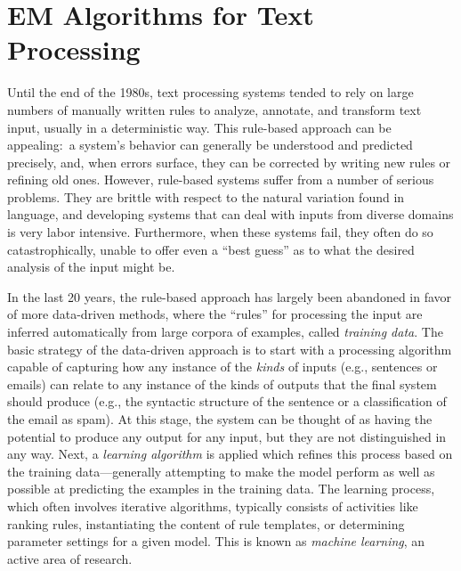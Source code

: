\chapter{EM Algorithms for Text Processing}
\label{chapter6}

Until the end of the 1980s, text processing systems tended to rely on
large numbers of manually written rules to analyze, annotate, and
transform text input, usually in a deterministic way.  This rule-based
approach can be appealing:\ a system's behavior can generally be
understood and predicted precisely, and, when errors surface, they can
be corrected by writing new rules or refining old ones. However,
rule-based systems suffer from a number of serious problems.  They are
brittle with respect to the natural variation found in language, and
developing systems that can deal with inputs from diverse domains is
very labor intensive.  Furthermore, when these systems fail, they
often do so catastrophically, unable to offer even a ``best guess'' as
to what the desired analysis of the input might be.

In the last 20 years, the rule-based approach has largely been
abandoned in favor of more data-driven methods, where the ``rules''
for processing the input are inferred automatically from large corpora
of examples, called \emph{training data}.  The basic strategy of the
data-driven approach is to start with a processing algorithm capable
of capturing how any instance of the \emph{kinds} of inputs (e.g.,
sentences or emails) can relate to any instance of the kinds of
outputs that the final system should produce (e.g., the syntactic
structure of the sentence or a classification of the email as spam).
At this stage, the system can be thought of as having the potential to
produce any output for any input, but they are not distinguished in
any way.  Next, a \emph{learning algorithm} is applied which refines
this process based on the training data---generally attempting to make
the model perform as well as possible at predicting the examples in
the training data.  The learning process, which often involves
iterative algorithms, typically consists of activities like ranking
rules, instantiating the content of rule templates, or determining
parameter settings for a given model. This is known as {\it machine
  learning}, an active area of research.

